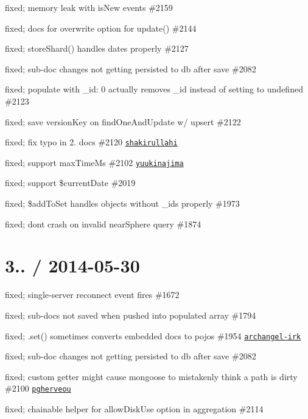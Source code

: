 \begin{DoxyItemize}
\item fixed; memory leak with is\+New events \#2159
\item fixed; docs for overwrite option for update() \#2144
\item fixed; store\+Shard() handles dates properly \#2127
\item fixed; sub-\/doc changes not getting persisted to db after save \#2082
\item fixed; populate with \+\_\+id\+: 0 actually removes \+\_\+id instead of setting to undefined \#2123
\item fixed; save version\+Key on find\+One\+And\+Update w/ upsert \#2122
\item fixed; fix typo in 2. docs \#2120 \href{https://github.com/shakirullahi}{\tt shakirullahi}
\item fixed; support max\+Time\+Ms \#2102 \href{https://github.com/yuukinajima}{\tt yuukinajima}
\item fixed; support \$current\+Date \#2019
\item fixed; \$add\+To\+Set handles objects without \+\_\+ids properly \#1973
\item fixed; dont crash on invalid near\+Sphere query \#1874
\end{DoxyItemize}

\section*{3.. / 2014-\/05-\/30 }


\begin{DoxyItemize}
\item fixed; single-\/server reconnect event fires \#1672
\item fixed; sub-\/docs not saved when pushed into populated array \#1794
\item fixed; .set() sometimes converts embedded docs to pojos \#1954 \href{https://github.com/archangel-irk}{\tt archangel-\/irk}
\item fixed; sub-\/doc changes not getting persisted to db after save \#2082
\item fixed; custom getter might cause mongoose to mistakenly think a path is dirty \#2100 \href{https://github.com/pgherveou}{\tt pgherveou}
\item fixed; chainable helper for allow\+Disk\+Use option in aggregation \#2114
\end{DoxyItemize}

